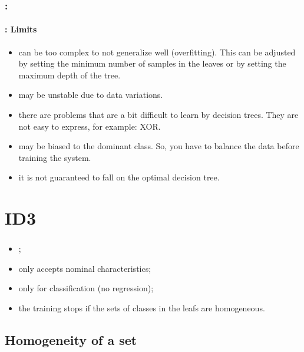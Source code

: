 \documentclass[xcolor=table]{beamer}
\begin{document}
\begin{frame}
	\frametitle{\insertshortsubtitle: \insertsection}
	\framesubtitle{\insertsubsection: Limits}
	
	\begin{itemize}
		\item can be too complex to not generalize well (overfitting). This can be adjusted by setting the minimum number of samples in the leaves or by setting the maximum depth of the tree.
		\item may be unstable due to data variations.
		\item there are problems that are a bit difficult to learn by decision trees. They are not easy to express, for example: XOR.
		\item may be biased to the dominant class. So, you have to balance the data before training the system.
		\item it is not guaranteed to fall on the optimal decision tree.
	\end{itemize}
	
\end{frame}

\section{ID3}

\begin{frame}
	\frametitle{\insertshortsubtitle}
	\framesubtitle{\insertsection}
	\begin{itemize}
		\item {};
		\item only accepts nominal characteristics;
		\item only for classification (no regression);
		\item the training stops if the sets of classes in the leafs are homogeneous.
	\end{itemize}
	
\end{frame}

\subsection{Homogeneity of a set}
\end{document}
